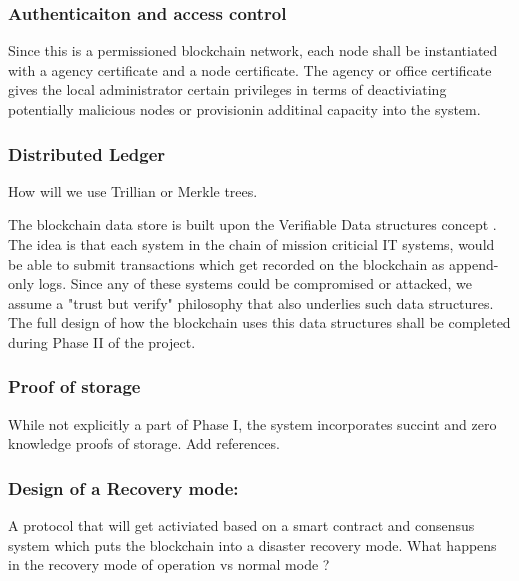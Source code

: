 \subsubsection{Authenticaiton and access control}

Since this is a permissioned blockchain network, each node shall be instantiated with a agency certificate and a node
certificate. The agency or office certificate gives the local administrator certain privileges in terms of deactiviating
potentially malicious nodes or provisionin additinal capacity into the system.

\subsubsection{Distributed Ledger}

How will we use Trillian or Merkle trees.

The blockchain data store is built upon the Verifiable Data structures concept \cite{verfiable2015}. The idea is that each
system in the chain of mission criticial IT systems, would be able to submit transactions which get recorded on the
blockchain as append-only logs. Since any of these systems could be compromised or attacked, we assume a "trust but
verify" philosophy that also underlies such data structures. The full design of how the blockchain uses this data
structures shall be completed during Phase II of the project.

\subsubsection{Proof of storage}

While not explicitly a part of Phase I, the system incorporates succint and zero knowledge proofs of storage. Add
references.


\subsubsection{Design of a Recovery mode:}

A protocol that will get activiated based on a smart contract and consensus system which puts the blockchain into a
disaster recovery mode.
What happens in the recovery mode of operation vs normal mode ?
